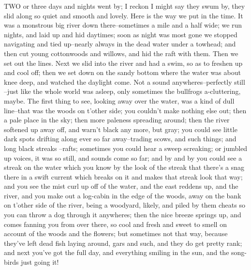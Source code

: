 TWO or three days and nights went by; I reckon I might say they swum by,
they slid along so quiet and smooth and lovely.  Here is the way we put
in the time.  It was a monstrous big river down there--sometimes a mile
and a half wide; we run nights, and laid up and hid daytimes; soon as
night was most gone we stopped navigating and tied up--nearly always in
the dead water under a towhead; and then cut young cottonwoods and
willows, and hid the raft with them.  Then we set out the lines.  Next we
slid into the river and had a swim, so as to freshen up and cool off;
then we set down on the sandy bottom where the water was about knee deep,
and watched the daylight come.  Not a sound anywheres--perfectly still
--just like the whole world was asleep, only sometimes the bullfrogs
a-cluttering, maybe.  The first thing to see, looking away over the water,
was a kind of dull line--that was the woods on t'other side; you couldn't
make nothing else out; then a pale place in the sky; then more paleness
spreading around; then the river softened up away off, and warn't black
any more, but gray; you could see little dark spots drifting along ever
so far away--trading scows, and such things; and long black streaks
--rafts; sometimes you could hear a sweep screaking; or jumbled up voices,
it was so still, and sounds come so far; and by and by you could see a
streak on the water which you know by the look of the streak that there's
a snag there in a swift current which breaks on it and makes that streak
look that way; and you see the mist curl up off of the water, and the
east reddens up, and the river, and you make out a log-cabin in the edge
of the woods, away on the bank on t'other side of the river, being a
woodyard, likely, and piled by them cheats so you can throw a dog through
it anywheres; then the nice breeze springs up, and comes fanning you from
over there, so cool and fresh and sweet to smell on account of the woods
and the flowers; but sometimes not that way, because they've left dead
fish laying around, gars and such, and they do get pretty rank; and next
you've got the full day, and everything smiling in the sun, and the
song-birds just going it!

